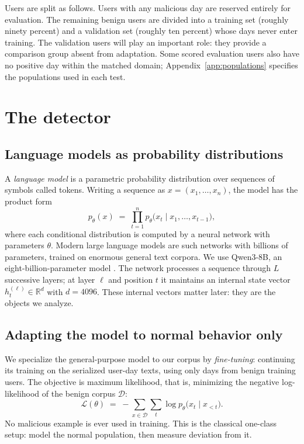 \documentclass[10pt]{article} %
\begin{document}
Users are split as follows. Users with any malicious day are reserved
entirely for evaluation. The remaining benign users are divided into a
training set (roughly ninety percent) and a validation set (roughly ten
percent) whose days never enter training. The validation users will
play an important role: they provide a comparison group absent from adaptation. Some scored
evaluation users also have no positive day within the matched domain;
Appendix~\ref{app:populations} specifies the populations used in each test.

\section{The detector}
\label{sec:detector}

\subsection{Language models as probability distributions}

A \emph{language model} is a parametric probability distribution over
sequences of symbols called tokens. Writing a sequence as
$x = (x_1, \dots, x_n)$, the model has the product form
\begin{equation}
p_\theta(x) \;=\; \prod_{t=1}^{n} p_\theta\bigl(x_t \mid x_1, \dots,
x_{t-1}\bigr),
\end{equation}
where each conditional distribution is computed by a neural network
with parameters $\theta$. Modern large language models are such
networks with billions of parameters, trained on enormous general text
corpora. We use Qwen3-8B, an eight-billion-parameter model \citep{qwen3}. The
network processes a sequence through $L$ successive layers; at layer
$\ell$ and position $t$ it maintains an internal state vector
$h^{(\ell)}_t \in \mathbb{R}^{d}$ with $d = 4096$. These internal
vectors matter later: they are the objects we analyze.

\subsection{Adapting the model to normal behavior only}

We specialize the general-purpose model to our corpus by
\emph{fine-tuning}: continuing its training on the serialized user-day
texts, using only days from benign training users. The objective is
maximum likelihood, that is, minimizing the negative log-likelihood of
the benign corpus $\mathcal{D}$:
\begin{equation}
\mathcal{L}(\theta) \;=\; -\sum_{x \in \mathcal{D}} \sum_{t}
\log p_\theta\bigl(x_t \mid x_{<t}\bigr).
\end{equation}
No malicious example is ever used in training. This is the classical
one-class setup: model the normal population, then measure deviation
from it.
\end{document}
